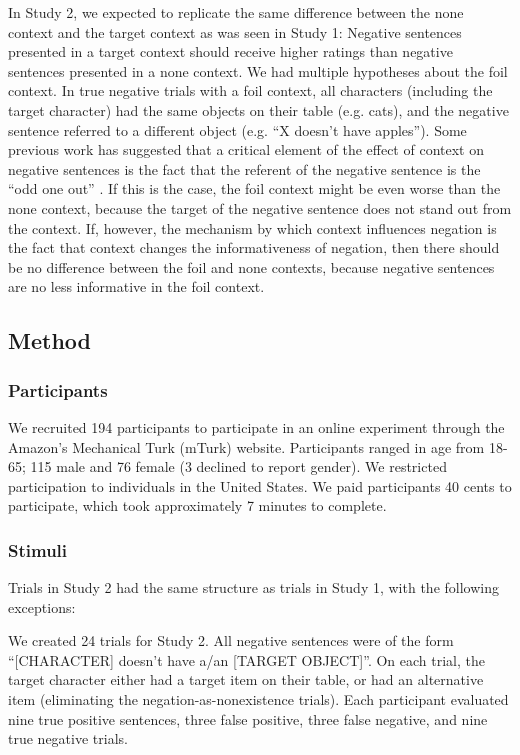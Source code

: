 \documentclass[10pt,letterpaper]{article}
\begin{document}
In Study 2, we expected to replicate the same difference between the none context and the target context as was seen in Study 1: Negative sentences presented in a target context should receive higher ratings than negative sentences presented in a none context.  We had multiple hypotheses about the foil context.  In true negative trials with a foil context, all characters (including the target character) had the same objects on their table (e.g. cats), and the negative sentence referred to a different object (e.g. ``X doesn't have apples'').  Some previous work has suggested that a critical element of the effect of context on negative sentences is the fact that the referent of the negative sentence is the ``odd one out'' \cite{wason1965}.  If this is the case, the foil context might be even worse than the none context, because the target of the negative sentence does not stand out from the context.  If, however, the mechanism by which context influences negation is the fact that context changes the informativeness of negation, then there should be no difference between the foil and none contexts, because negative sentences are no less informative in the foil context.  

\subsection{Method}

\subsubsection{Participants}
We recruited 194 participants to participate in an online experiment through the Amazon's Mechanical Turk (mTurk) website.  Participants ranged in age from 18-65; 115 male and 76 female (3 declined to report gender).  We restricted participation to individuals in the United States. We paid participants 40 cents to participate, which took approximately 7 minutes to complete.  


\subsubsection{Stimuli}
Trials in Study 2 had the same structure as trials in Study 1, with the following exceptions:

We created 24 trials for Study 2.  All negative sentences were of the form ``[CHARACTER] doesn't have a/an [TARGET OBJECT]''.  On each trial, the target character either had a target item on their table, or had an alternative item (eliminating the negation-as-nonexistence trials).  Each participant evaluated nine true positive sentences, three false positive, three false negative, and nine true negative trials.
\end{document}
